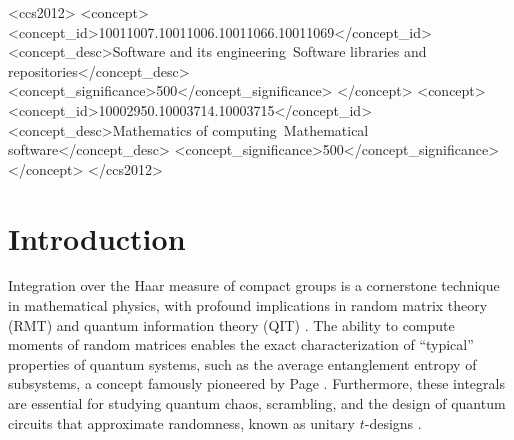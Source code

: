 \documentclass[manuscript,screen]{acmart}
\begin{document}
\begin{CCSXML}
<ccs2012>
   <concept>
       <concept_id>10011007.10011006.10011066.10011069</concept_id>
       <concept_desc>Software and its engineering~Software libraries and
repositories</concept_desc>
       <concept_significance>500</concept_significance>
       </concept>
   <concept>
       <concept_id>10002950.10003714.10003715</concept_id>
       <concept_desc>Mathematics of computing~Mathematical
software</concept_desc>
       <concept_significance>500</concept_significance>
       </concept>
 </ccs2012>
\end{CCSXML}



\maketitle

\section{Introduction}
\label{sec:intro}
Integration over the Haar measure of compact groups is a cornerstone technique
in mathematical physics, with profound implications in random matrix theory
(RMT) \cite{mehta2004random, forrester2010log, livan2018introduction} and
quantum information theory (QIT) \cite{nielsen2010quantum, watrous2018theory}.
The ability to compute moments of random matrices enables the exact
characterization of ``typical'' properties of quantum systems, such as the
average entanglement entropy of subsystems, a concept famously pioneered by Page
\cite{page1993average}. Furthermore, these integrals are essential for studying
quantum chaos, scrambling, and the design of quantum circuits that approximate
randomness, known as unitary $t$-designs \cite{brandao2016exponential}.
\end{document}
